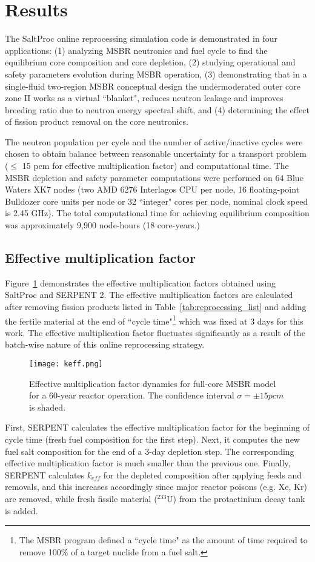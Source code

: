 \section{Results}
The SaltProc online reprocessing simulation code is demonstrated in four applications: (1) analyzing  \gls{MSBR} neutronics and fuel cycle to find the equilibrium core composition and core depletion, (2) studying operational and safety parameters evolution during \gls{MSBR} operation, (3) demonstrating that in a single-fluid two-region \gls{MSBR} conceptual design the undermoderated outer core zone II works as a virtual ``blanket", reduces neutron leakage and improves breeding ratio due to neutron energy spectral shift, and (4) determining the effect of fission product removal on the core neutronics.

The neutron population per cycle and the number of active/inactive cycles were chosen to obtain balance between reasonable uncertainty for a transport problem ($\leq$ 15 pcm for effective multiplication factor) and computational time. The \gls{MSBR} depletion and safety parameter computations were performed on 64 Blue Waters XK7 nodes (two AMD 6276 Interlagos CPU per node, 16 floating-point Bulldozer core units per node or 32 ``integer" cores per node, nominal clock speed is 2.45 GHz). The total computational time for achieving equilibrium composition was approximately 9,900 node-hours (18 core-years.)

\subsection{Effective multiplication factor}
Figure~\ref{fig:keff} demonstrates the effective multiplication factors obtained using SaltProc and SERPENT 2. The effective multiplication factors are calculated after removing fission products listed in Table~\ref{tab:reprocessing_list} and adding the fertile material at the end of ``cycle time"\footnote{The \gls{MSBR} program defined a ``cycle time" as the amount of time required to remove 100\% of a target nuclide from a fuel salt.} which was fixed at 3 days for this work. The effective multiplication factor fluctuates significantly as a result of the batch-wise nature of this online reprocessing strategy. 
\begin{figure}[hbp!] %
  \centering
  \texttt{[image: keff.png]}
  \caption{Effective multiplication factor dynamics for full-core \gls{MSBR} model for a 60-year reactor operation. The confidence interval $\sigma=\pm15pcm$ is shaded.}
  \label{fig:keff}
\end{figure}
\FloatBarrier
First, SERPENT calculates the effective multiplication factor for the beginning of cycle time (fresh fuel composition for the first step). Next, it computes the new fuel salt composition for the end of a 3-day depletion step. The corresponding effective multiplication factor is much smaller than the previous one. Finally, SERPENT calculates $k_{eff}$ for the depleted composition after applying feeds and removals, and this increases accordingly since major reactor poisons (e.g. Xe, Kr) are removed, while fresh fissile material ($^{233}$U) from the protactinium decay tank is added. 

